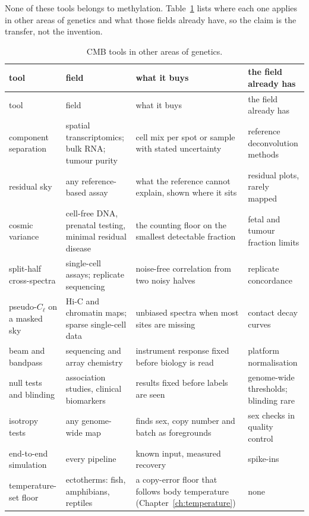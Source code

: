 None of these tools belongs to methylation. Table~\ref{tab:elsewhere} lists where each one applies in other areas of genetics and what those
fields already have, so the claim is the transfer, not the invention.

\begin{center}\small
\begin{longtable}{@{}p{}p{}p{}p{}@{}}
\caption{CMB tools in other areas of genetics.}\label{tab:elsewhere}\\
\toprule tool & field & what it buys & the field already has \\\midrule\endfirsthead
\toprule tool & field & what it buys & the field already has \\\midrule\endhead
component separation & spatial transcriptomics; bulk RNA; tumour purity & cell mix per spot or sample with stated uncertainty & reference
deconvolution methods \\
residual sky & any reference-based assay & what the reference cannot explain, shown where it sits & residual plots, rarely mapped \\
cosmic variance & cell-free DNA, prenatal testing, minimal residual disease & the counting floor on the smallest detectable fraction & fetal
and tumour fraction limits \\
split-half cross-spectra & single-cell assays; replicate sequencing & noise-free correlation from two noisy halves & replicate concordance \\
pseudo-$C_\ell$ on a masked sky & Hi-C and chromatin maps; sparse single-cell data & unbiased spectra when most sites are missing & contact
decay curves \\
beam and bandpass & sequencing and array chemistry & instrument response fixed before biology is read & platform normalisation \\
null tests and blinding & association studies, clinical biomarkers & results fixed before labels are seen & genome-wide thresholds; blinding
rare \\
isotropy tests & any genome-wide map & finds sex, copy number and batch as foregrounds & sex checks in quality control \\
end-to-end simulation & every pipeline & known input, measured recovery & spike-ins \\
temperature-set floor & ectotherms: fish, amphibians, reptiles & a copy-error floor that follows body temperature (Chapter~\ref{ch:temperature})
& none \\\bottomrule
\end{longtable}
\end{center}

